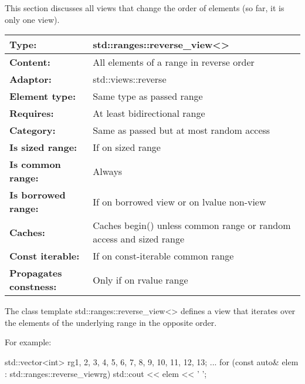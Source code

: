 
This section discusses all views that change the order of elements (so far, it is only one view).


\begin{longtable}[c]{|l|l|}
\hline
\textbf{Type:}              & std::ranges::reverse\_view\textless{}\textgreater{}                 \\ \hline
\endfirsthead
%
\endhead
%
\textbf{Content:}              & All elements of a range in reverse order \\ \hline
\textbf{Adaptor:}              & std::views::reverse                      \\ \hline
\textbf{Element type:}         & Same type as passed range                \\ \hline
\textbf{Requires:}             & At least bidirectional range             \\ \hline
\textbf{Category:}             & Same as passed but at most random access \\ \hline
\textbf{Is sized range:}       & If on sized range                        \\ \hline
\textbf{Is common range:}      & Always                                   \\ \hline
\textbf{Is borrowed range:} & If on borrowed view or on lvalue non-view                           \\ \hline
\textbf{Caches:}            & Caches begin() unless common range or random access and sized range \\ \hline
\textbf{Const iterable:}       & If on const-iterable common range        \\ \hline
\textbf{Propagates constness:} & Only if on rvalue range                  \\ \hline
\end{longtable}

The class template std::ranges::reverse\_view<> defines a view that iterates over the elements of the underlying range in the opposite order.

For example:

\begin{cpp}
std::vector<int> rg{1, 2, 3, 4, 5, 6, 7, 8, 9, 10, 11, 12, 13};
...
for (const auto& elem : std::ranges::reverse_view{rg}) {
	std::cout << elem << ' ';
}
\end{cpp}

